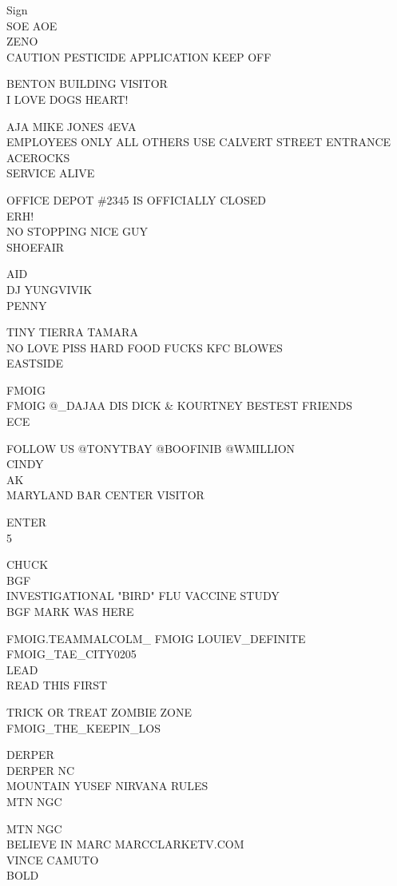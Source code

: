 \documentclass[10pt,letterpaper]{article}
\begin{document}
Sign\\
SOE AOE\\
ZENO\\
CAUTION PESTICIDE APPLICATION KEEP OFF

BENTON BUILDING VISITOR\\
I LOVE DOGS HEART!

AJA MIKE JONES 4EVA\\
EMPLOYEES ONLY ALL OTHERS USE CALVERT STREET ENTRANCE\\
ACEROCKS\\
SERVICE ALIVE

OFFICE DEPOT \#2345 IS OFFICIALLY CLOSED\\
ERH!\\
NO STOPPING NICE GUY\\
SHOEFAIR

AID\\
DJ YUNGVIVIK\\
PENNY

TINY TIERRA TAMARA\\
NO LOVE PISS HARD FOOD FUCKS KFC BLOWES\\
EASTSIDE

FMOIG\\
FMOIG @\_DAJAA DIS DICK \& KOURTNEY BESTEST FRIENDS\\
ECE

FOLLOW US @TONYTBAY @BOOFINIB @WMILLION\\
CINDY\\
AK\\
MARYLAND BAR CENTER VISITOR

ENTER\\
5

CHUCK\\
BGF\\
INVESTIGATIONAL "BIRD" FLU VACCINE STUDY\\
BGF MARK WAS HERE

FMOIG.TEAMMALCOLM\_ FMOIG LOUIEV\_DEFINITE FMOIG\_TAE\_CITY0205\\
LEAD\\
READ THIS FIRST

TRICK OR TREAT ZOMBIE ZONE\\
FMOIG\_THE\_KEEPIN\_LOS

DERPER\\
DERPER NC\\
MOUNTAIN YUSEF NIRVANA RULES\\
MTN NGC

MTN NGC\\
BELIEVE IN MARC MARCCLARKETV.COM\\
VINCE CAMUTO\\
BOLD
\end{document}
